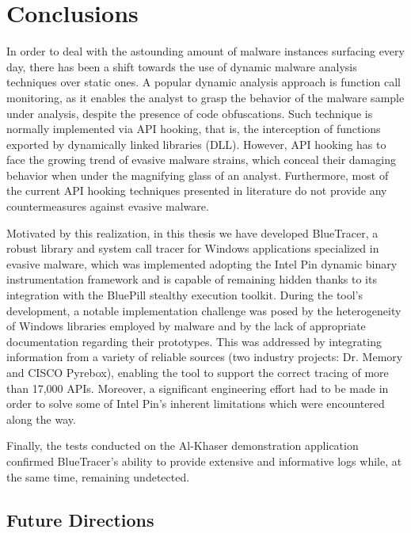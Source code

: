 
\chapter{Conclusions}

In order to deal with the astounding amount of malware instances surfacing every day, there has been a shift towards the use of dynamic malware analysis techniques over static ones. A popular dynamic analysis approach is function call monitoring, as it enables the analyst to grasp the behavior of the malware sample under analysis, despite the presence of code obfuscations. Such technique is normally implemented via API hooking, that is, the interception of functions exported by dynamically linked libraries (DLL). However, API hooking has to face the growing trend of evasive malware strains, which conceal their damaging behavior when under the magnifying glass of an analyst. Furthermore, most of the current API hooking techniques presented in literature do not provide any countermeasures against evasive malware.

Motivated by this realization, in this thesis we have developed BlueTracer, a robust library and system call tracer for Windows applications specialized in evasive malware, which was implemented adopting the Intel Pin dynamic binary instrumentation framework and is capable of remaining hidden thanks to its integration with the BluePill stealthy execution toolkit. During the tool's development, a notable implementation challenge was posed by the heterogeneity of Windows libraries employed by malware and by the lack of appropriate documentation regarding their prototypes. This was addressed by integrating information from a variety of reliable sources (two industry projects: Dr. Memory and CISCO Pyrebox), enabling the tool to support the correct tracing of more than 17,000 APIs. Moreover, a significant engineering effort had to be made in order to solve some of Intel Pin's inherent limitations which were encountered along the way.

Finally, the tests conducted on the Al-Khaser demonstration application confirmed BlueTracer's ability to provide extensive and informative logs while, at the same time, remaining undetected.    

\section{Future Directions}

